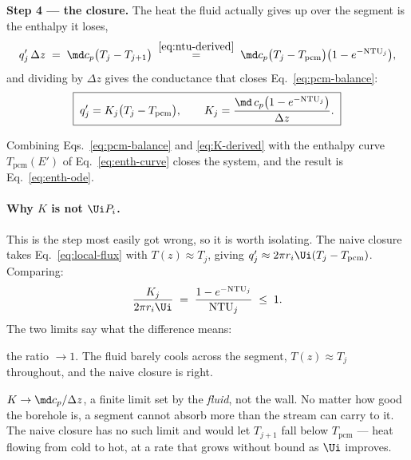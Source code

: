 \medskip
\noindent\textbf{Step 4 --- the closure.}
The heat the fluid actually gives up over the segment is the enthalpy it loses,
\begin{equation}
  q'_{j}\,\Delta z \;=\; \md c_{p}\bigl(T_{j}-T_{j+1}\bigr)
  \;\overset{\eqref{eq:ntu-derived}}{=}\;
  \md c_{p}\bigl(T_{j}-T_{\mathrm{pcm}}\bigr)\bigl(1-e^{-\mathrm{NTU}_{j}}\bigr),
\end{equation}
and dividing by $\Delta z$ gives the conductance that closes
Eq.~\eqref{eq:pcm-balance}:
\begin{equation}
  \boxed{\;
  q'_{j} = K_{j}\bigl(T_{j}-T_{\mathrm{pcm}}\bigr),
  \qquad
  K_{j} = \frac{\md\,c_{p}\bigl(1-e^{-\mathrm{NTU}_{j}}\bigr)}{\Delta z} .
  \;}
  \label{eq:K-derived}
\end{equation}

Combining Eqs.~\eqref{eq:pcm-balance} and \eqref{eq:K-derived} with the
enthalpy curve $T_{\mathrm{pcm}}(E')$ of Eq.~\eqref{eq:enth-curve} closes the
system, and the result is Eq.~\eqref{eq:enth-ode}.

\paragraph{Why $K$ is not $\Ui P_{i}$.}
This is the step most easily got wrong, so it is worth isolating. The naive
closure takes Eq.~\eqref{eq:local-flux} with $T(z)\approx T_{j}$, giving
$q'_{j}\approx 2\pi r_{i}\Ui (T_{j}-T_{\mathrm{pcm}})$. Comparing:
\begin{equation}
  \frac{K_{j}}{2\pi r_{i}\Ui}
  \;=\;
  \frac{1-e^{-\mathrm{NTU}_{j}}}{\mathrm{NTU}_{j}}
  \;\le\; 1 .
  \label{eq:K-ratio}
\end{equation}
The two limits say what the difference means:

\begin{description}[leftmargin=1.9em,itemsep=3pt]
\item[$\mathrm{NTU}\to0$:] the ratio $\to1$. The fluid barely cools across the
  segment, $T(z)\approx T_{j}$ throughout, and the naive closure is right.
\item[$\mathrm{NTU}\to\infty$:] $K\to \md c_{p}/\Delta z$, a finite limit set
  by the \emph{fluid}, not the wall. No matter how good the borehole is, a
  segment cannot absorb more than the stream can carry to it. The naive closure
  has no such limit and would let $T_{j+1}$ fall below $T_{\mathrm{pcm}}$ ---
  heat flowing from cold to hot, at a rate that grows without bound as $\Ui$
  improves.
\end{description}

